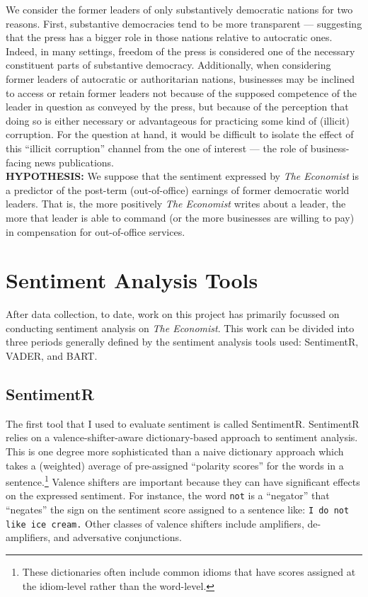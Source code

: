 \documentclass[11pt, letterpaper, twoside]{article}
\begin{document}
We consider the former leaders of only substantively democratic nations for two reasons. First, substantive democracies tend to be more transparent --- suggesting that the press has a bigger role in those nations relative to autocratic ones. Indeed, in many settings, freedom of the press is considered one of the necessary constituent parts of substantive democracy. Additionally, when considering former leaders of autocratic or authoritarian nations, businesses may be inclined to access or retain former leaders not because of the supposed competence of the leader in question as conveyed by the press, but because of the perception that doing so is either necessary or advantageous for practicing some kind of (illicit) corruption. For the question at hand, it would be difficult to isolate the effect of this ``illicit corruption'' channel from the one of interest --- the role of business-facing news publications.\\

\textsc{\textbf{HYPOTHESIS: }} We suppose that the sentiment expressed by \textit{The Economist} is a predictor of the post-term (out-of-office) earnings of former democratic world leaders. That is, the more positively \textit{The Economist} writes about a leader, the more that leader is able to command (or the more businesses are willing to pay) in compensation for out-of-office services.

\section{Sentiment Analysis Tools}
After data collection, to date, work on this project has primarily focussed on conducting sentiment analysis on \textit{The Economist}. This work can be divided into three periods generally defined by the sentiment analysis tools used: SentimentR, VADER, and BART.

\subsection{SentimentR}
    The first tool that I used to evaluate sentiment is called SentimentR. SentimentR relies on a valence-shifter-aware dictionary-based approach to sentiment analysis. This is one degree more sophisticated than a naive dictionary approach which takes a (weighted) average of pre-assigned ``polarity scores'' for the words in a sentence.\footnote{These dictionaries often include common idioms that have scores assigned at the idiom-level rather than the word-level.} Valence shifters are important because they can have significant effects on the expressed sentiment. For instance, the word \verb|not| is a ``negator'' that ``negates'' the sign on the sentiment score assigned to a sentence like: \verb|I do not like ice cream.| Other classes of valence shifters include amplifiers, de-amplifiers, and adversative conjunctions.\\
\end{document}
